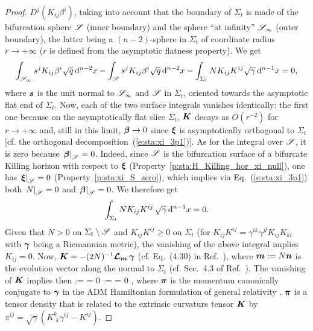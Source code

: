 \begin{proof}
$D^j \left( K_{ij} \beta^i \right)$, taking into account that
the boundary of $\Sigma_t$ is made
of the bifurcation sphere $\mathscr{S}$ (inner boundary) and the sphere ``at infinity''
$\mathscr{S}_\infty$ (outer boundary), the latter being a $(n-2)$-sphere in $\Sigma_t$
of coordinate radius $r\to +\infty$ ($r$ is defined from the asymptotic flatness
property). We get
\[
    \int_{\mathscr{S}_\infty} s^j K_{ij} \beta^i \sqrt{q} \,  \mathrm{d}^{n-2} x
    - \int_{\mathscr{S}} s^j K_{ij} \beta^i \sqrt{q} \, \mathrm{d}^{n-2} x
    -  \int_{\Sigma_t} N K_{ij} K^{ij}  \sqrt{\gamma} \, \mathrm{d}^{n-1} x =  0 ,
\]
where $\bm{s}$ is the unit normal to $\mathscr{S}_\infty$ and $\mathscr{S}$ in $\Sigma_t$,
oriented towards the asymptotic flat end of $\Sigma_t$. Now, each of the two surface
integrals vanishes identically:
the first one because on the asymptotically flat slice $\Sigma_t$, $\bm{K}$ decays
as $O(r^{-2})$ for $r\to +\infty$ and, still in this limit,  $\bm{\beta}\to 0$
since $\bm{\xi}$ is asymptotically orthogonal to $\Sigma_t$
[cf. the orthogonal decomposition~(\ref{e:sta:xi_3p1})].
As for the integral over $\mathscr{S}$, it is zero because
$\left. \bm{\beta} \right| _{\mathscr{S}} =  0$.
Indeed, since $\mathscr{S}$ is the bifurcation surface of a bifurcate Killing
horizon with respect to $\bm{\xi}$ (Property~\ref{p:sta:H_Killing_hor_xi_null}),
one has  $\left. \bm{\xi} \right| _{\mathscr{S}} = 0$ (Property~\ref{p:sta:xi_S_zero}),
which implies via Eq.~(\ref{e:sta:xi_3p1}) both $\left. N \right| _{\mathscr{S}} = 0$ and
$\left. \bm{\beta} \right| _{\mathscr{S}} = 0$. We therefore get
\[
    \int_{\Sigma_t} N K_{ij} K^{ij} \, \sqrt{\gamma} \, \mathrm{d}^{n-1} x = 0 .
\]
Given that $N > 0$ on $\Sigma_t\setminus \mathscr{S}$ and $K_{ij} K^{ij} \geq 0$ on $\Sigma_t$ (for
$K_{ij} K^{ij} = \gamma^{ik} \gamma^{jl} K_{ij} K_{kl}$ with
$\bm{\gamma}$ being a Riemannian metric), the vanishing of the above integral
implies $K_{ij} = 0$.
Now, $\bm{K} = - (2N)^{-1} \bm{\mathcal{L}}_{\bm{\bm{m}}}\, \bm{\gamma}$ (cf. Eq.~(4.30) in Ref.~\cite{Gourg12}), where $\bm{m} := N \bm{n}$
is the evolution vector along the normal to $\Sigma_t$ (cf. Sec.~4.3 of Ref.~\cite{Gourg12}).
The vanishing of $\bm{K}$ implies then
\be \label{e:sta:dot_gamma_dot_pi}
   \dot{\w{\gamma}} :=   \w{\gamma} = 0 \qand
   \dot{\w{\pi}} :=   \w{\pi} = 0 ,
\ee
where $\bm{\pi}$ is the momentum canonically conjugate to $\bm{\gamma}$ in
the ADM Hamiltonian formulation of general relativity \cite{ArnowDM62,FischM79}.
$\bm{\pi}$ is a tensor density
that is related to the extrinsic curvature tensor $\bm{K}$ by
$\pi^{ij} = \sqrt{\gamma} (K^k_{\ \, k} \gamma^{ij} - K^{ij})$.

\end{proof}
